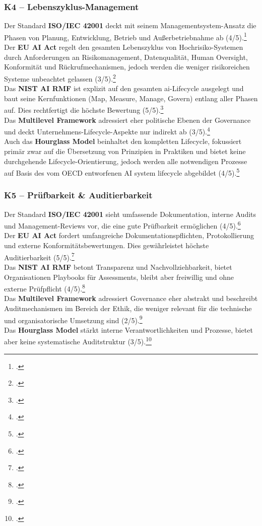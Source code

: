 \subsubsection{K4 – Lebenszyklus-Management}
Der Standard \textbf{ISO/IEC 42001} deckt mit seinem Managementsystem-Ansatz die Phasen von Planung, Entwicklung, Betrieb und Außerbetriebnahme ab (4/5).\footcite[][Kap.~6--10]{isoISOIEC42001}
\\
Der \textbf{EU AI Act} regelt den gesamten Lebenszyklus von Hochrisiko-Systemen durch Anforderungen an Risikomanagement, Datenqualität, Human Oversight, Konformität und Rückrufmechanismen, jedoch werden die weniger risikoreichen Systeme unbeachtet gelassen (3/5).\footcite[][S.~3--5]{europeanparliamentaryresearchserviceArtificialIntelligenceAct2024}
\\
Das \textbf{NIST AI RMF} ist explizit auf den gesamten \ac{ai}-Lifecycle ausgelegt und baut seine Kernfunktionen (Map, Measure, Manage, Govern) entlang aller Phasen auf. 
Dies rechtfertigt die höchste Bewertung (5/5).\footcite[][S.~6--8]{nationalinstituteofstandardsandtechnologyAIRiskManagement2021}
\\
Das \textbf{Multilevel Framework} adressiert eher politische Ebenen der Governance und deckt Unternehmens-Lifecycle-Aspekte nur indirekt ab (3/5).\footcite[][S.~7--9]{choungMultilevelFrameworkAI2023}
\\
Auch das \textbf{Hourglass Model} beinhaltet den kompletten Lifecycle, fokussiert primär zwar auf die Übersetzung von Prinzipien in Praktiken und bietet keine durchgehende Lifecycle-Orientierung, jedoch werden alle notwendigen Prozesse auf Basis des vom OECD entworfenen AI system lifecycle abgebildet (4/5).\footcite[][S.~8--10]{mantymakiPDFPuttingAI2025}


\subsubsection{K5 – Prüfbarkeit \& Auditierbarkeit}
Der Standard \textbf{ISO/IEC 42001} sieht umfassende Dokumentation, interne Audits und Management-Reviews vor, die eine gute Prüfbarkeit ermöglichen (4/5).\footcite[][Kap.~9]{isoISOIEC42001}
\\
Der \textbf{EU AI Act} fordert umfangreiche Dokumentationspflichten, Protokollierung und externe Konformitätsbewertungen.
Dies gewährleistet höchste Auditierbarkeit (5/5).\footcite[][S.~4--6]{europeanparliamentaryresearchserviceArtificialIntelligenceAct2024}
\\
Das \textbf{NIST AI RMF} betont Transparenz und Nachvollziehbarkeit, bietet Organisationen Playbooks für Assessments, bleibt aber freiwillig und ohne externe Prüfpflicht (4/5).\footcite[][S.~8--10]{nationalinstituteofstandardsandtechnologyAIRiskManagement2021}  
\\
Das \textbf{Multilevel Framework} adressiert Governance eher abstrakt und beschreibt Auditmechanismen im Bereich der Ethik, die weniger relevant für die technische und organisatorische Umsetzung sind (2/5).\footcite[][S.~7--9]{choungMultilevelFrameworkAI2023}
\\
Das \textbf{Hourglass Model} stärkt interne Verantwortlichkeiten und Prozesse, bietet aber keine systematische Auditstruktur (3/5).\footcite[][S.~4--6]{mantymakiPDFPuttingAI2025}

